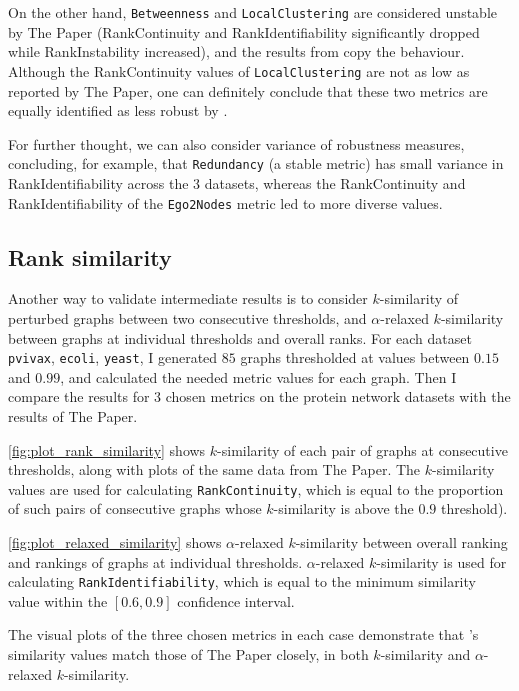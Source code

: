 On the other hand, \texttt{Betweenness} and \texttt{LocalClustering} are considered unstable by The Paper (RankContinuity and RankIdentifiability significantly dropped while RankInstability increased), and the results from \graffs copy the behaviour.
Although the RankContinuity values of \texttt{LocalClustering} are not as low as reported by The Paper, one can definitely conclude that these two metrics are equally identified as less robust by \graffs.

For further thought, we can also consider variance of robustness measures, concluding, for example, that \texttt{Redundancy} (a stable metric) has small variance in RankIdentifiability across the 3 datasets, whereas the RankContinuity and RankIdentifiability of the \texttt{Ego2Nodes} metric led to more diverse values.

\subsection{Rank similarity}

Another way to validate intermediate results is to consider $k$-similarity of perturbed graphs between two consecutive thresholds, and $\alpha$-relaxed $k$-similarity between graphs at individual thresholds and overall ranks.
For each dataset \texttt{pvivax}, \texttt{ecoli}, \texttt{yeast}, I generated $85$ graphs thresholded at values between $0.15$ and $0.99$, and calculated the needed metric values for each graph.
Then I compare the results for 3 chosen metrics on the protein network datasets with the results of The Paper.



\afterpage{\clearpage}

\autoref{fig:plot_rank_similarity} shows $k$-similarity of each pair of graphs at consecutive thresholds, along with plots of the same data from The Paper.
The $k$-similarity values are used for calculating \texttt{RankContinuity}, which is equal to the proportion of such pairs of consecutive graphs whose $k$-similarity is above the $0.9$ threshold).

\autoref{fig:plot_relaxed_similarity} shows $\alpha$-relaxed $k$-similarity between overall ranking and rankings of graphs at individual thresholds.
$\alpha$-relaxed $k$-similarity is used for calculating \texttt{RankIdentifiability}, which is equal to the minimum similarity value within the $\left[ 0.6, 0.9 \right]$ confidence interval.

The visual plots of the three chosen metrics in each case demonstrate that \graffs's similarity values match those of The Paper closely, in both $k$-similarity and $\alpha$-relaxed $k$-similarity.

